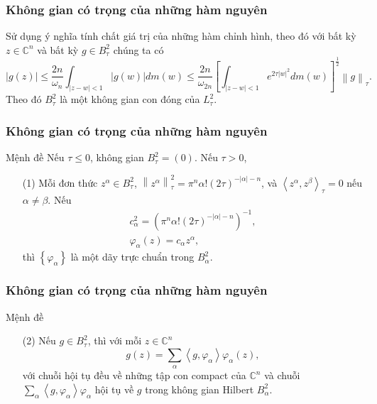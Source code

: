 \documentclass[11pt]{beamer}
\numberwithin{equation}{section}
\theoremstyle{plain}
\theoremstyle{definition}
\theoremstyle{remark}
\begin{document}
\begin{frame}\frametitle{Không gian có trọng của những hàm nguyên}
Sử dụng ý nghĩa tính chất giá trị của những hàm chỉnh hình, theo đó với bất kỳ $z\in\mathbb{C}^{n}$ và bất kỳ $g\in B_{\tau}^{2}$ chúng ta có
\[\left| {g\left( z \right)} \right| \le \frac{{2n}}{{{\omega _n}}}\int_{\left| {z - w} \right| < 1} {\left| {g\left( w \right)} \right|dm\left( w \right)}  \le \frac{{2n}}{{{\omega _{2n}}}}{\left[ {\int_{\left| {z - w} \right| < 1} {{e^{2\tau {{\left| w \right|}^2}}}dm\left( w \right)} } \right]^{\frac{1}{2}}}{\left\| g \right\|_\tau }.\]
Theo đó $B_{\tau}^{2}$ là một không gian con đóng của $L_{\tau}^{2}$.
\end{frame}


\begin{frame}\frametitle{Không gian có trọng của những hàm nguyên}
\begin{block}{Mệnh đề}
Nếu $\tau\le 0$, không gian $B_{\tau}^{2}=\left(0\right)$. Nếu $\tau>0$,
\begin{itemize}
\item[(1)] Mỗi đơn thức $z^\alpha\in B_{\tau}^{2}$, $\left\| {{z^\alpha }} \right\|_\tau ^2 = {\pi ^n}\alpha !{\left( {2\tau } \right)^{ - \left| \alpha  \right| - n}}$, và ${\left\langle {{z^\alpha },{z^\beta }} \right\rangle _\tau } = 0$ nếu $\alpha\neq\beta$. Nếu
\[\begin{array}{l}
c_\alpha ^2 = {\left( {{\pi ^n}\alpha !{{\left( {2\tau } \right)}^{ - \left| \alpha  \right| - n}}} \right)^{ - 1}},\\
{\varphi _\alpha }\left( z \right) = {c_\alpha }{z^\alpha },
\end{array}\]
thì $\left\{\varphi_{\alpha}\right\}$ là một dãy trực chuẩn trong $B_{\alpha}^{2}$.
\end{itemize}
\end{block}
\end{frame}



\begin{frame}\frametitle{Không gian có trọng của những hàm nguyên}
\begin{block}{Mệnh đề}
\begin{itemize}
\item[(2)] Nếu $g\in B_{\tau}^{2}$, thì với mỗi $z\in\mathbb{C}^n$
\[g\left( z \right) = \sum\limits_\alpha  {\left\langle {g,{\varphi _\alpha }} \right\rangle {\varphi _\alpha }\left( z \right)} ,\]
với chuỗi hội tụ đều về những tập con compact của $\mathbb{C}^n$ và chuỗi $\sum\limits_\alpha  {\left\langle {g,{\varphi _\alpha }} \right\rangle {\varphi _\alpha }} $ hội tụ về $g$ trong không gian Hilbert $B_{\alpha}^{2}$.
\end{itemize}
\end{block}
\end{frame}
\end{document}
